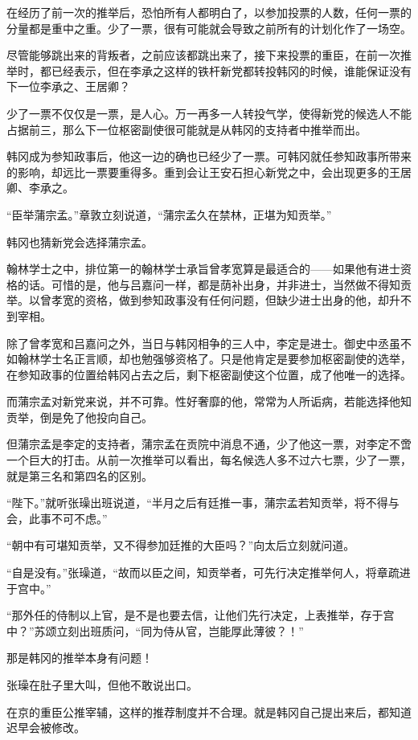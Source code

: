在经历了前一次的推举后，恐怕所有人都明白了，以参加投票的人数，任何一票的分量都是重中之重。少了一票，很有可能就会导致之前所有的计划化作了一场空。

尽管能够跳出来的背叛者，之前应该都跳出来了，接下来投票的重臣，在前一次推举时，都已经表示，但在李承之这样的铁杆新党都转投韩冈的时候，谁能保证没有下一位李承之、王居卿？

少了一票不仅仅是一票，是人心。万一再多一人转投气学，使得新党的候选人不能占据前三，那么下一位枢密副使很可能就是从韩冈的支持者中推举而出。

韩冈成为参知政事后，他这一边的确也已经少了一票。可韩冈就任参知政事所带来的影响，却远比一票要重得多。重到会让王安石担心新党之中，会出现更多的王居卿、李承之。

“臣举蒲宗孟。”章敦立刻说道，“蒲宗孟久在禁林，正堪为知贡举。”

韩冈也猜新党会选择蒲宗孟。

翰林学士之中，排位第一的翰林学士承旨曾孝宽算是最适合的——如果他有进士资格的话。可惜的是，他与吕嘉问一样，都是荫补出身，并非进士，当然做不得知贡举。以曾孝宽的资格，做到参知政事没有任何问题，但缺少进士出身的他，却升不到宰相。

除了曾孝宽和吕嘉问之外，当日与韩冈相争的三人中，李定是进士。御史中丞虽不如翰林学士名正言顺，却也勉强够资格了。只是他肯定是要参加枢密副使的选举，在参知政事的位置给韩冈占去之后，剩下枢密副使这个位置，成了他唯一的选择。

而蒲宗孟对新党来说，并不可靠。性好奢靡的他，常常为人所诟病，若能选择他知贡举，倒是免了他投向自己。

但蒲宗孟是李定的支持者，蒲宗孟在贡院中消息不通，少了他这一票，对李定不啻一个巨大的打击。从前一次推举可以看出，每名候选人多不过六七票，少了一票，就是第三名和第四名的区别。

“陛下。”就听张璪出班说道，“半月之后有廷推一事，蒲宗孟若知贡举，将不得与会，此事不可不虑。”

“朝中有可堪知贡举，又不得参加廷推的大臣吗？”向太后立刻就问道。

“自是没有。”张璪道，“故而以臣之间，知贡举者，可先行决定推举何人，将章疏进于宫中。”

“那外任的侍制以上官，是不是也要去信，让他们先行决定，上表推举，存于宫中？”苏颂立刻出班质问，“同为侍从官，岂能厚此薄彼？！”

那是韩冈的推举本身有问题！

张璪在肚子里大叫，但他不敢说出口。

在京的重臣公推宰辅，这样的推荐制度并不合理。就是韩冈自己提出来后，都知道迟早会被修改。


